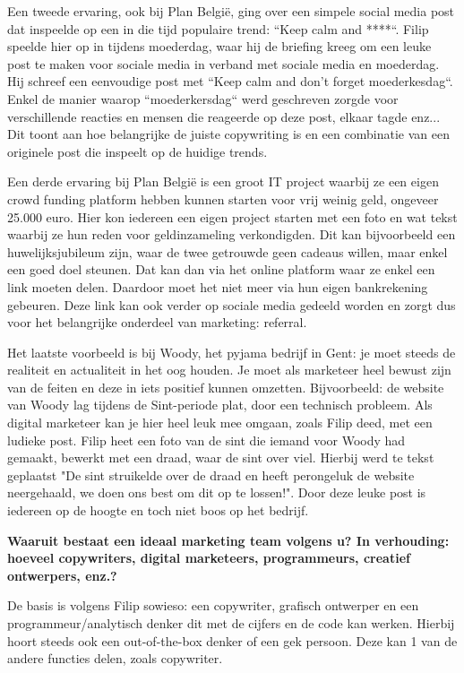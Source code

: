 	Een tweede ervaring, ook bij Plan België, ging over een simpele social media post dat inspeelde op een in die tijd populaire trend: ``Keep calm and ****``. Filip speelde hier op in tijdens moederdag, waar hij de briefing kreeg om een leuke post te maken voor sociale media in verband met sociale media en moederdag. Hij schreef een eenvoudige post met ``Keep calm and don't forget moederkesdag``. Enkel de manier waarop ``moederkersdag`` werd geschreven zorgde voor verschillende reacties en mensen die reageerde op deze post, elkaar tagde enz... Dit toont aan hoe belangrijke de juiste copywriting is en een combinatie van een originele post die inspeelt op de huidige trends.
	
	Een derde ervaring bij Plan België is een groot IT project waarbij ze een eigen crowd funding platform hebben kunnen starten voor vrij weinig geld, ongeveer 25.000 euro. Hier kon iedereen een eigen project starten met een foto en wat tekst waarbij ze hun reden voor geldinzameling verkondigden. Dit kan bijvoorbeeld een huwelijksjubileum zijn, waar de twee getrouwde geen cadeaus willen, maar enkel een goed doel steunen. Dat kan dan via het online platform waar ze enkel een link moeten delen. Daardoor moet het niet meer via hun eigen bankrekening gebeuren. Deze link kan ook verder op sociale media gedeeld worden en zorgt dus voor het belangrijke onderdeel van marketing: referral.
	
	Het laatste voorbeeld is bij Woody, het pyjama bedrijf in Gent: je moet steeds de realiteit en actualiteit in het oog houden. Je moet als marketeer heel bewust zijn van de feiten en deze in iets positief kunnen omzetten. Bijvoorbeeld: de website van Woody lag tijdens de Sint-periode plat, door een technisch probleem. Als digital marketeer kan je hier heel leuk mee omgaan, zoals Filip deed, met een ludieke post. Filip heet een foto van de sint die iemand voor Woody had gemaakt, bewerkt met een draad, waar de sint over viel. Hierbij werd te tekst geplaatst "De sint struikelde over de draad en heeft perongeluk de website neergehaald, we doen ons best om dit op te lossen!". Door deze leuke post is iedereen op de hoogte en toch niet boos op het bedrijf.
	
\textbf{Waaruit bestaat een ideaal marketing team volgens u? In verhouding: hoeveel copywriters, digital marketeers, programmeurs, creatief ontwerpers, enz.?}
	
	De basis is volgens Filip sowieso: een copywriter, grafisch ontwerper en een programmeur/analytisch denker dit met de cijfers en de code kan werken. Hierbij hoort steeds ook een out-of-the-box denker of een gek persoon. Deze kan 1 van de andere functies delen, zoals copywriter.	
	
